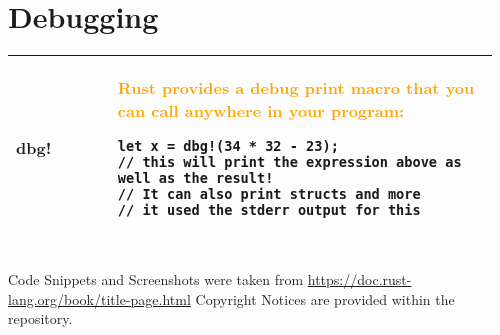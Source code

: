 \documentclass[main.tex,fontsize=8pt,paper=a4,paper=portrait,DIV=calc,]{scrartcl}
\begin{document}
\pagebreak
\begin{table}[ht!]
\section{Debugging}
\begin{tabular}{|m{0.2\linewidth}|m{0.755\linewidth}|}
\hline
dbg! &
\textcolor{orange}{Rust provides a debug print macro that you can call anywhere in your program:}\newline
\begin{lstlisting}
let x = dbg!(34 * 32 - 23); 
// this will print the expression above as well as the result!
// It can also print structs and more
// it used the stderr output for this
\end{lstlisting}\\
\hline

\hline

\hline

\hline
\end{tabular}
\end{table}
\pagebreak 
\begin{table}[ht!]
\begin{tabular}{|m{0.2\linewidth}|m{0.755\linewidth}|}
\hline

\hline

\hline

\hline

\hline

\hline

\hline

\hline

\hline

\hline
\end{tabular}
\end{table}
Code Snippets and Screenshots were taken from \href{https://doc.rust-lang.org/book/title-page.html}{https://doc.rust-lang.org/book/title-page.html}\newline
Copyright Notices are provided within the repository.
\end{document}
